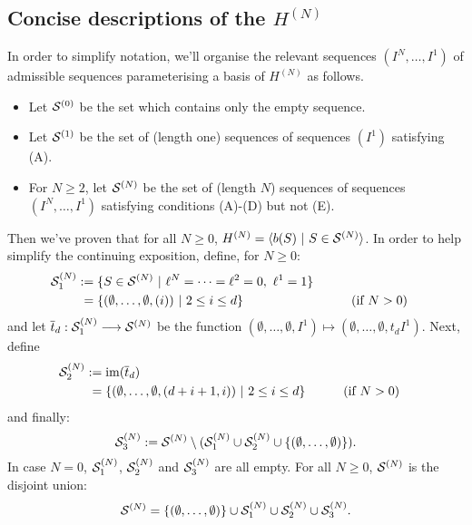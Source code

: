 \documentclass[10pt]{article}
\renewcommand{\Q}{Q}
\begin{document}
\begin{CalculatingRepeatedKoszul}
\subsection{Concise descriptions of the $H^{(N)}$}
In order to simplify notation, we'll organise the relevant sequences $(I^{N},\ldots,I^1)$ of admissible sequences parameterising a basis of $H^{{(N)}}$ as follows.
\begin{itemize}
\squishlist
\item Let $\mathcal{S}^{(0)}$ be the set which contains only the empty sequence.
\item Let $\mathcal{S}^{(1)}$ be the set of (length one) sequences of sequences $(I^1)$ satisfying \textup{(A)}.
\item For $N\geq2$, let $\mathcal{S}^{(N)}$ be the set of (length $N$) sequences of sequences $(I^{N},\ldots,I^1)$ satisfying conditions \textup{(A)}-\textup{(D)} but not \textup{(E)}.
\end{itemize}
Then we've proven that for all $N\geq0$, $H^{(N)}=\langle b(S)\ |\ S\in\mathcal{S}^{(N)}\rangle$.
In order to help simplify the continuing exposition, define, for $N\geq0$:
\begin{alignat*}{2}
\calS^{(N)}_1
&:=
\{S\in \calS^{(N)}\ |\ \ell^{N}=\cdots =\ell^2=0,\ \ell^1=1\}%
\\
&\phantom{:}=
\{(\emptyset,\ldots,\emptyset,(i))\ |\ 2\leq i\leq d\}&\qquad&\text{(if $N>0$)}
\end{alignat*}
and let $\overline{t}_d:\mathcal{S}_1^{(N)}\longrightarrow\mathcal{S}^{(N)}$ be the function $(\emptyset,\ldots,\emptyset,I^1)\mapsto (\emptyset,\ldots,\emptyset,t_dI^1)$. Next, define
\begin{alignat*}{2}
\calS^{(N)}_2
&:=
\im(\overline{t}_d)%
\\
&\phantom{:}=
\{(\emptyset,\ldots,\emptyset,(d+i+1,i))\ |\ 2\leq i\leq d\}%
&\qquad&\text{(if $N>0$)}
\end{alignat*}
and finally:
\[\mathcal{S}^{(N)}_3:=\mathcal{S}^{(N)}\setminus(\mathcal{S}^{(N)}_1\cup \mathcal{S}^{(N)}_2\cup\{(\emptyset,\ldots,\emptyset)\}).\]
In case $N=0$, $\mathcal{S}^{(N)}_1$, $\mathcal{S}^{(N)}_2$ and $\mathcal{S}^{(N)}_3$ are all empty. For all $N\geq0$, $\mathcal{S}^{(N)}$ is the disjoint union:
\[\mathcal{S}^{(N)}=\{(\emptyset,\ldots,\emptyset)\}\cup\mathcal{S}^{(N)}_1\cup\mathcal{S}^{(N)}_2\cup\mathcal{S}^{(N)}_3.\]


\end{CalculatingRepeatedKoszul}
\end{document}
